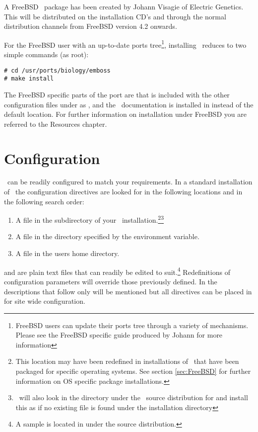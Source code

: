 \documentclass{report}
\begin{document}
A FreeBSD \EMBOSS\ package has been created by Johann
Visagie of Electric Genetics. This will be
distributed on the installation CD's and through the normal
distribution channels from FreeBSD version 4.2 onwards.

For the FreeBSD user with an up-to-date ports tree\footnote{FreeBSD
users can update their ports tree through a variety of
mechanisms. Please see the FreeBSD specific guide produced by Johann
for more information}, installing \EMBOSS\ reduces to two simple
commands (as root):

\begin{verbatim}
# cd /usr/ports/biology/emboss
# make install
\end{verbatim}

The FreeBSD specific parts of the port are that
 is included with the other configuration
files under  as
, and the \EMBOSS\ documentation is
installed in  instead of the
default location.  For further information on installation under
FreeBSD you are referred to the Resources chapter.


\chapter{Configuration}
 
\EMBOSS\ can be readily configured to match your requirements. In a
standard installation of \EMBOSS\ the configuration directives are
looked for in the following locations and in the following search
order:
\begin{enumerate}
\item A file  in the 
subdirectory of your \EMBOSS\ installation.\footnote{This location may
have been redefined in installations of \EMBOSS\ that have been
packaged for specific operating systems. See section \ref{sec:FreeBSD}
for further information on OS specific package
installations.}\footnote{\EMBOSS\ will also look in the
 directory under the \EMBOSS\ source distribution for
 and install this as
 if no existing file is found under the
installation directory}
\item A file  in the directory specified by the
 environment variable.
\item A file  in the users home directory.
\end{enumerate}
 and  are plain text
files that can readily be edited to suit.\footnote{A sample
 is located in  under
the source distribution.} Redefinitions of configuration parameters
will override those previously defined. In the descriptions that
follow only  will be mentioned but all directives
can be placed in  for site wide
configuration.
\end{document}
